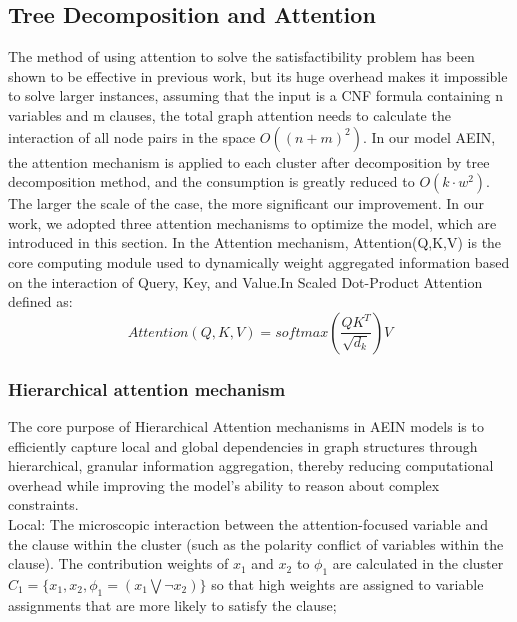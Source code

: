 \subsection{Tree Decomposition and Attention}
The method of using attention to solve the satisfactibility problem has been shown to be effective in 
previous work, but its huge overhead makes it impossible to solve larger instances, assuming that the 
input is a CNF formula containing n variables and m clauses, the total graph attention needs to calculate 
the interaction of all node pairs in the space \(O((n+m)^2)\). In our model AEIN, the attention mechanism 
is applied to each cluster after decomposition by tree decomposition method, and the consumption is greatly 
reduced to \(O(k⋅w^2)\). The larger the scale of the case, the more significant our improvement.
In our work, we adopted three attention mechanisms to optimize the model, which are introduced in this section.
In the Attention mechanism, Attention(Q,K,V) is the core computing module used to dynamically weight 
aggregated information based on the interaction of Query, Key, and Value.In Scaled Dot-Product Attention 
defined as:
\begin{equation}
Attention(Q,K,V)=softmax(\frac{QK^T}{\sqrt{d_k}})V
\end{equation}
\subsubsection{Hierarchical attention mechanism}
The core purpose of Hierarchical Attention mechanisms in AEIN models is to efficiently capture local and 
global dependencies in graph structures through hierarchical, granular information aggregation, thereby 
reducing computational overhead while improving the model's ability to reason about complex constraints.\\

Local: The microscopic interaction between the attention-focused variable and the clause within the cluster 
(such as the polarity conflict of variables within the clause).
The contribution weights of \(x_1\) and \(x_2\) to \(\phi_1\) are calculated in the cluster 
\(C_1=\{x_1,x_2,\phi_1=(x_1\bigvee ¬x_2)\}\) so that high weights are assigned to variable assignments 
that are more likely to satisfy the clause;\\

